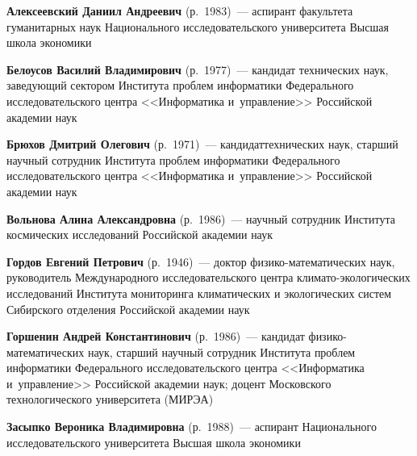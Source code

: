 \begin{multicols}{2}

\noindent
\textbf{Алексеевский Даниил Андреевич} (р.\ 1983)~---
аспирант факультета гуманитарных наук Национального исследовательского 
университета Высшая школа экономики

\vspace*{1pt}


\noindent
\textbf{Белоусов Василий Владимирович} (р.\ 1977)~---
кан\-дидат технических наук, заведующий сектором Институ\-та проб\-лем информатики 
Федерального исследовательского центра <<Информатика и~управ\-ле\-ние>> 
Российской академии наук

\vspace*{1pt}

\noindent
\textbf{Брюхов Дмитрий Олегович} (р.\ 1971)~---
кандидат\linebreak технических наук, старший научный сотрудник Института проб\-лем 
информатики Федерального исследовательского центра <<Информатика и~управ\-ле\-ние>> 
Российской академии наук %

\vspace*{1pt}

\noindent
\textbf{Вольнова Алина Александровна} (р.\ 1986)~--- 
научный сотрудник Института космических исследований Российской академии наук 

\vspace*{1pt}


 \noindent
\textbf{Гордов Евгений Петрович} (р.\ 1946)~---
доктор фи\-зи\-ко-ма\-те\-ма\-ти\-че\-ских наук, руководитель Международного 
исследовательского центра кли\-ма\-то-эко\-ло\-ги\-че\-ских исследований Института 
мониторинга климатических и экологических систем Сибирского отделения 
Российской академии наук 

\vspace*{1pt}

\noindent
\textbf{Горшенин Андрей Константинович} (р.\ 1986)~---
кандидат фи\-зи\-ко-ма\-те\-ма\-ти\-че\-ских наук, старший научный 
сотрудник Института проб\-лем информатики Федерального исследовательского центра 
<<Информатика и~управ\-ле\-ние>> Российской академии наук; 
доцент %
Московского технологического университета (МИРЭА)

\vspace*{1pt}


\noindent
\textbf{Засыпко Вероника Владимировна} (р.\ 1988)~---
аспирант Национального исследовательского университета Высшая школа экономики


\end{multicols}
